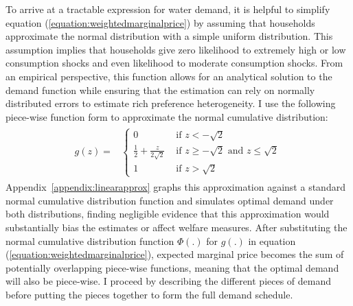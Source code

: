 \documentclass[12pt]{article}
\begin{document}
To arrive at a tractable expression for water demand, it is helpful to simplify equation (\ref{equation:weightedmarginalprice}) by assuming that households approximate the normal distribution with a simple uniform distribution.  This assumption implies that households give zero likelihood to extremely high or low consumption shocks and even likelihood to moderate consumption shocks.  From an empirical perspective, this function allows for an analytical solution to the demand function while ensuring that the estimation can rely on normally distributed errors to estimate rich preference heterogeneity.  I use the following piece-wise function form to approximate the normal cumulative distribution:
\begin{align*}
\begin{split}
g(z)=& 
\begin{cases}
       0  							  & \text{ if } z    < -\sqrt{2}                       \\
     \frac{1}{2} + \frac{z}{2\sqrt2}  & \text{ if } z \geq -\sqrt{2} \text{ and } z \leq \sqrt{2}  \\
       1 						      & \text{ if } z    >  \sqrt{2}
    \end{cases}
\end{split}
\end{align*}
Appendix~\ref{appendix:linearapprox} graphs this approximation against a standard normal cumulative distribution function and simulates optimal demand under both distributions, finding negligible evidence that this approximation would substantially bias the estimates or affect welfare measures.  After substituting the normal cumulative distribution function $\Phi(.)$ for $g(.)$ in equation (\ref{equation:weightedmarginalprice}), expected marginal price becomes the sum of potentially overlapping piece-wise functions, meaning that the optimal demand will also be piece-wise.  I proceed by describing the different pieces of demand before putting the pieces together to form the full demand schedule.
\end{document}
